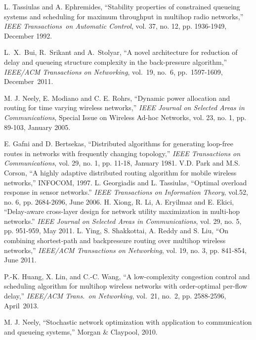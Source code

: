 \documentclass{sig-alternate-2013}
\begin{document}
\begin{thebibliography}{99}
	L. Tassiulas and A. Ephremides, ``Stability properties of constrained queueing systems and scheduling for maximum throughput in multihop radio networks,'' \emph{IEEE Transactions~on Automatic Control}, vol. 37, no. 12, pp. 1936-1949, December 1992.
	
L.~X.~Bui, R.~Srikant and A.~Stolyar, ``A novel architecture for reduction of delay and queueing structure complexity in the back-pressure algorithm,'' \emph{IEEE/ACM Transactions on Networking}, vol.~19, no.~6, pp.~1597-1609, December~2011.

 M. J. Neely, E. Modiano and C. E. Rohrs, ``Dynamic power allocation and routing for time varying wireless networks,'' \emph{IEEE Journal on Selected Areas in Communications}, Special Issue on Wireless Ad-hoc Networks, vol. 23, no. 1, pp. 89-103, January 2005.

	E. Gafni and D. Bertsekas, ``Distributed algorithms for generating loop-free routes in networks with frequently changing topology,'' \emph{IEEE Transactions on Communications}, vol. 29, no. 1, pp. 11-18, January 1981.
	V.D. Park and M.S. Corson, ``A highly adaptive distributed routing algorithm for mobile wireless networks,'' INFOCOM, 1997.
	L. Georgiadis and L. Tassiulas, ``Optimal overload response in sensor networks.'' \emph{IEEE Transactions on Information Theory}, vol.52, no. 6, pp. 2684-2696, June 2006.
	H. Xiong, R. Li, A. Eryilmaz and E. Ekici, ``Delay-aware cross-layer design for network utility maximization in multi-hop networks.'' \emph{IEEE Journal on Selected Areas in Communications}, vol. 29, no. 5, pp. 951-959, May 2011.
	L. Ying, S. Shakkottai, A. Reddy and S. Liu, ``On combining shortest-path and backpressure routing over multihop wireless networks,'' \emph{IEEE/ACM Transactions on Networking}, vol. 19, no. 3, pp. 841-854, June 2011.
	
P.-K. Huang, X. Lin, and C.-C. Wang, ``A low-complexity congestion control and scheduling algorithm for multihop wireless networks with order-optimal per-flow delay,'' \emph{IEEE/ACM Trans.~on Networking}, vol.~21, no.~2, pp. 2588-2596, April~2013.

M. J. Neely, ``Stochastic network optimization with application to communication and queueing systems,'' Morgan \& Claypool, 2010.


\end{thebibliography}
\end{document}
